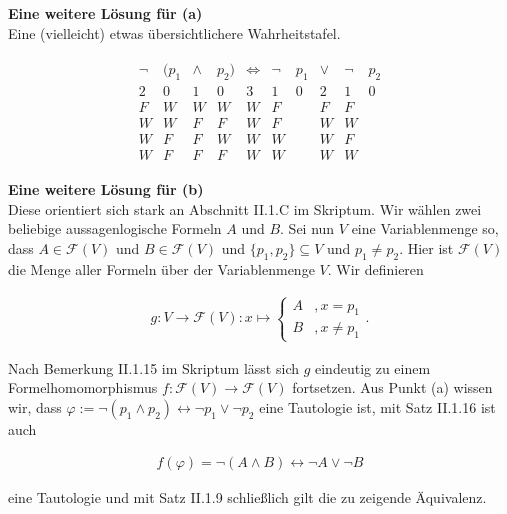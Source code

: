 
\begin{solution}

\textbf{Eine weitere Lösung für (a)} \\
Eine (vielleicht) etwas übersichtlichere Wahrheitstafel.

\begin{align*}
    \begin{array}{cccccccccc}
        \neg & (p_1 & \land & p_2) & \iff & \neg & p_1 & \lor & \neg & p_2 \\
        \hline
        2 & 0 & 1 & 0 & 3 & 1 & 0 & 2 & 1 & 0 \\
        \hline
        F & W & W & W & W & F & & F & F & \\
        W & W & F & F & W & F & & W & W & \\
        W & F & F & W & W & W & & W & F & \\
        W & F & F & F & W & W & & W & W &
    \end{array}
\end{align*}

\end{solution}


\begin{solution}

\textbf{Eine weitere Lösung für (b)} \\
Diese orientiert sich stark an Abschnitt II.1.C im Skriptum.
Wir wählen zwei beliebige aussagenlogische Formeln $A$ und $B$. Sei nun $V$ eine Variablenmenge so, dass $A \in \mathcal{F}(V)$ und $B \in \mathcal{F}(V)$ und $\{p_1, p_2\} \subseteq V$ und $p_1 \neq p_2$. Hier ist $\mathcal{F}(V)$ die Menge aller Formeln über der Variablenmenge $V$.
Wir definieren

\begin{align*}
    g: V \to \mathcal{F}(V): x \mapsto
    \begin{cases}
        A & , x = p_1 \\
        B & , x \neq p_1
    \end{cases}.
\end{align*}

Nach Bemerkung II.1.15 im Skriptum lässt sich $g$ eindeutig zu einem Formelhomomorphismus $f:\mathcal{F}(V) \to \mathcal{F}(V)$ fortsetzen. Aus Punkt (a) wissen wir, dass $\varphi := \neg (p_1 \land p_2) \leftrightarrow \neg p_1 \lor \neg p_2$ eine Tautologie ist, mit Satz II.1.16 ist auch 

\begin{align*}
    f(\varphi) = \neg (A \land B) \leftrightarrow \neg A \lor \neg B
\end{align*}

eine Tautologie und mit Satz II.1.9 schließlich gilt die zu zeigende Äquivalenz.

\end{solution}

